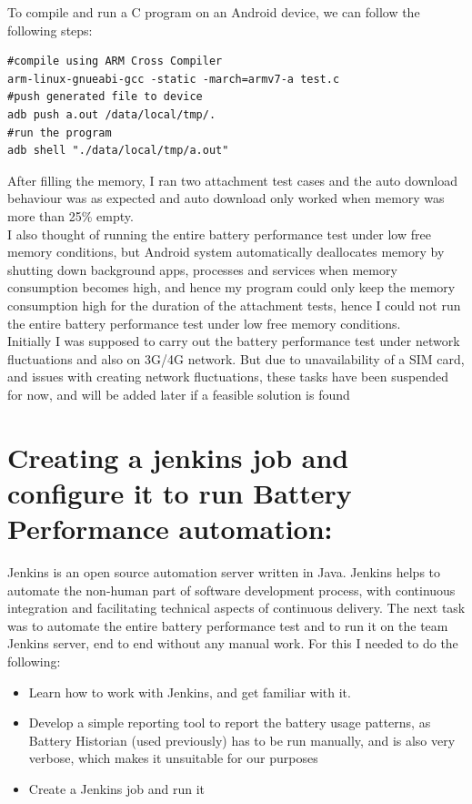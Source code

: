 To compile and run a C program on an Android device, we can follow the following steps:
\begin{lstlisting}[style=ShellStyle]
#compile using ARM Cross Compiler
arm-linux-gnueabi-gcc -static -march=armv7-a test.c 
#push generated file to device
adb push a.out /data/local/tmp/.
#run the program
adb shell "./data/local/tmp/a.out"  
\end{lstlisting}
After filling the memory, I ran two attachment test cases and the auto download behaviour was as expected and auto download only worked when memory was more than 25\% empty.\\

I also thought of running the entire battery performance test under low free memory conditions, but Android system automatically deallocates memory by shutting down background apps, processes and services when memory consumption becomes high, and hence my program could only keep the memory consumption high for the duration of the attachment tests, hence I could not run the entire battery performance test under low free memory conditions. \\

Initially I was supposed to carry out the battery performance test under network fluctuations and also on 3G/4G network. But due to unavailability of a SIM card, and issues with creating network fluctuations, these tasks have been suspended for now, and will be added later if a feasible solution is found\\

\section{Creating a jenkins job and configure it to run Battery Performance automation: }Jenkins is an open source automation server written in Java. Jenkins helps to automate the non-human part of software development process, with continuous integration and facilitating technical aspects of continuous delivery. The next task was to automate the entire battery performance test and to run it on the team Jenkins server, end to end without any manual work. For this I needed to do the following:
\begin{itemize}
	\item Learn how to work with Jenkins, and get familiar with it.
	\item Develop a simple reporting tool to report the battery usage patterns, as Battery Historian (used previously) has to be run manually, and is also very verbose, which makes it unsuitable for our purposes
	\item Create a Jenkins job and run it
\end{itemize}

